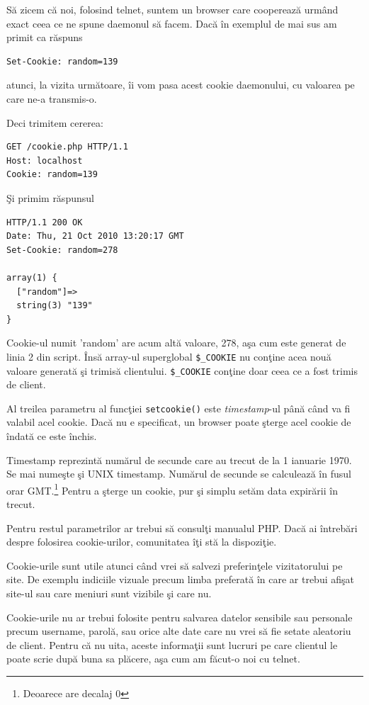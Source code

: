 Să zicem că noi, folosind telnet, suntem un browser care cooperează urm\^and
exact ceea ce ne spune daemonul să facem.
Dacă \^in exemplul de mai sus am primit ca răspuns
\begin{verbatim}
Set-Cookie: random=139
\end{verbatim}
atunci, la vizita următoare, \^ii vom pasa acest cookie daemonului,
cu valoarea pe care ne-a transmis-o.

Deci trimitem cererea:
\begin{verbatim}
GET /cookie.php HTTP/1.1
Host: localhost
Cookie: random=139

\end{verbatim} 
Şi primim răspunsul
\begin{verbatim}
HTTP/1.1 200 OK
Date: Thu, 21 Oct 2010 13:20:17 GMT
Set-Cookie: random=278

array(1) {
  ["random"]=>
  string(3) "139"
}
\end{verbatim} 

Cookie-ul numit 'random' are acum altă valoare, 278, aşa cum este generat de linia 2 din script. \^Insă
array-ul superglobal \texttt{\$\_COOKIE} nu conţine acea nouă valoare generată şi trimisă
clientului. \texttt{\$\_COOKIE} conţine doar ceea ce a fost trimis de client.


Al treilea parametru al funcţiei \texttt{setcookie()} este \textsl{timestamp}-ul p\^ană
c\^and va fi valabil acel cookie. Dacă nu e specificat, un browser poate
şterge acel cookie de \^indată ce este \^inchis. 

Timestamp reprezintă numărul de secunde care au trecut de la 1 ianuarie 1970. Se mai numeşte
şi UNIX timestamp. Numărul de secunde se calculează \^in fusul orar GMT.\footnote{Deoarece
are decalaj 0} Pentru a şterge un cookie, pur şi simplu setăm data expirării \^in trecut.

Pentru restul parametrilor ar trebui să consulţi manualul PHP. Dacă ai \^intrebări
despre folosirea cookie-urilor, comunitatea {\phpro} \^iţi stă la dispoziţie.

Cookie-urile sunt utile atunci c\^and vrei să salvezi preferinţele vizitatorului
pe site. De exemplu indiciile vizuale precum limba preferată \^in care ar
trebui afişat site-ul sau care meniuri sunt vizibile şi care nu.

Cookie-urile nu ar trebui folosite pentru salvarea datelor sensibile sau personale
precum username, parolă, sau orice alte date care nu vrei să fie setate aleatoriu
de client. Pentru că nu uita, aceste informaţii sunt lucruri pe care
clientul le poate scrie după buna sa plăcere, aşa cum am făcut-o noi cu telnet.


